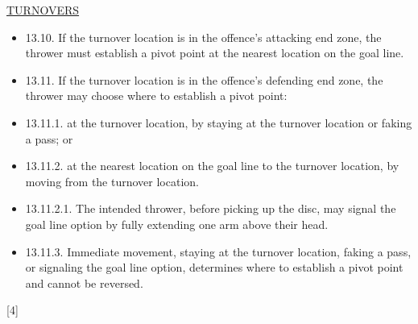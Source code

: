 \begin{center}\underline{\uppercase{turnovers}}\end{center}

\begin{itemize}
    \item 13.10. If the turnover location is in the offence’s attacking end zone, the thrower must establish a pivot point at the nearest location on the goal line.
    \item 13.11. If the turnover location is in the offence’s defending end zone, the thrower may choose where to establish a pivot point:
    \item 13.11.1. at the turnover location, by staying at the turnover location or faking a pass; or
    \item 13.11.2. at the nearest location on the goal line to the turnover location, by moving from the turnover location.
    \item 13.11.2.1. The intended thrower, before picking up the disc, may signal the goal line option by fully extending one arm above their head.
    \item 13.11.3. Immediate movement, staying at the turnover location, faking a pass, or signaling the goal line option, determines where to establish a pivot point and cannot be reversed.
\end{itemize}


\begin{center}[4]\end{center}
